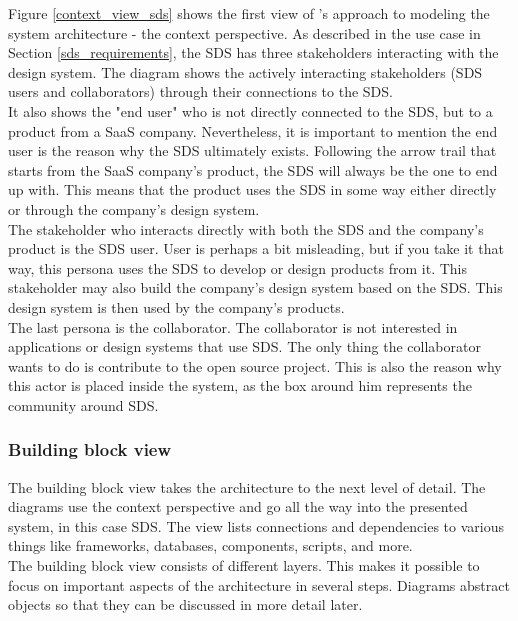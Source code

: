 Figure \ref{context_view_sds} shows the first view of \citeauthor{starke_effektive_2020}'s approach to modeling the system architecture - the context perspective. As described in the use case in Section \ref{sds_requirements}, the \ac{SDS} has three stakeholders interacting with the design system. The diagram shows the actively interacting stakeholders (\ac{SDS} users and collaborators) through their connections to the \ac{SDS}. \\
It also shows the "end user" who is not directly connected to the \ac{SDS}, but to a product from a \ac{SaaS} company. Nevertheless, it is important to mention the end user is the reason why the \ac{SDS} ultimately exists. Following the arrow trail that starts from the \ac{SaaS} company's product, the \ac{SDS} will always be the one to end up with. This means that the product uses the \ac{SDS} in some way either directly or through the company's design system. \\
The stakeholder who interacts directly with both the SDS and the company's product is the SDS user. User is perhaps a bit misleading, but if you take it that way, this persona uses the SDS to develop or design products from it. This stakeholder may also build the company's design system based on the SDS. This design system is then used by the company's products.\\
The last persona is the collaborator. The collaborator is not interested in applications or design systems that use SDS. The only thing the collaborator wants to do is contribute to the open source project. This is also the reason why this actor is placed inside the system, as the box around him represents the community around SDS.

\subsubsection{Building block view}
The building block view takes the architecture to the next level of detail. The diagrams use the context perspective and go all the way into the presented system, in this case \ac{SDS}. The view lists connections and dependencies to various things like frameworks, databases, components, scripts, and more. \\
The building block view consists of different layers. This makes it possible to focus on important aspects of the architecture in several steps. Diagrams abstract objects so that they can be discussed in more detail later. \cite{starke_effektive_2020} \\

